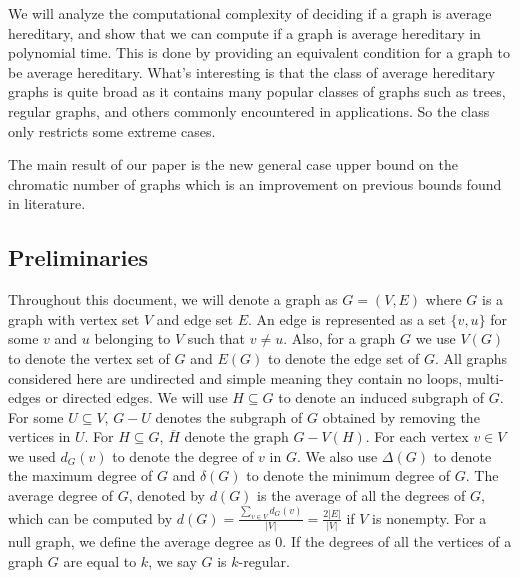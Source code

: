 \documentclass{article}
\begin{document}
We will analyze the computational complexity of deciding if a graph is average hereditary, and show that we can compute if a graph is average hereditary in polynomial time. This is done by providing an equivalent condition for a graph to be average hereditary. What's interesting is that the class of average hereditary graphs is quite broad as it contains many popular classes of graphs such as trees, regular graphs, and others commonly encountered in applications. So the class only restricts some extreme cases. 

The main result of our paper is the new general case upper bound on the chromatic number of graphs which is an improvement on previous bounds found in literature. 

\subsection{Preliminaries}\label{sec: prelim}
Throughout this document, we will denote a graph as $G = (V, E)$ where $G$ is a graph with vertex set $V$ and edge set $E$. An edge is represented as a set $\{v,u\}$ for some $v$ and $u$ belonging to $V$ such that $v \neq u$. Also, for a graph $G$ we use $V(G)$ to denote the vertex set of $G$ and $E(G)$ to denote the edge set of $G$. All graphs considered here are undirected and simple meaning they contain no loops, multi-edges or directed edges. We will use $H \subseteq G$ to denote an induced subgraph of $G$. For some $U \subseteq V$, $G-U$ denotes the subgraph of $G$ obtained by removing the vertices in $U$. For $H \subseteq G$, \;$\overline{H}$ denote the graph $G-V(H)$. For each vertex $v\in V$ we used $d_G(v)$ to denote the degree of $v$ in $G$. We also use $\Delta(G)$ to denote the maximum degree of $G$ and $\delta(G)$ to denote the minimum degree of $G$. The average degree of $G$, denoted by $d(G)$ is the average of all the degrees of $G$, which can be computed by $d(G) = \frac{\sum_{v\in V}d_G(v)}{|V|}= \frac{2|E|}{|V|}$ if $V$ is nonempty. For a null graph, we define the average degree as 0. If the degrees of all the vertices of a graph $G$ are equal to $k$, we say $G$ is $k$-regular.
 
\end{document}
